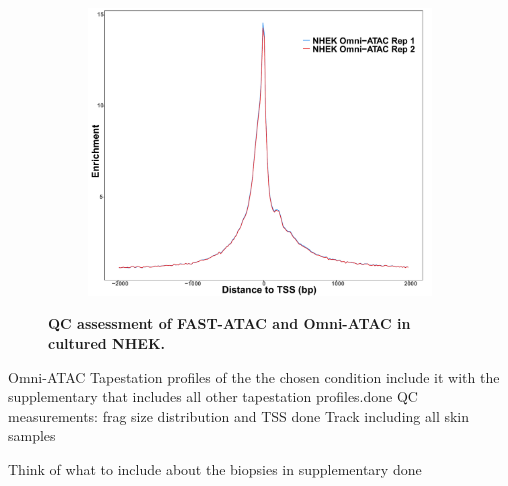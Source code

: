 \begin{figure}[htbp]
\begin{subfigure}{0.5\textwidth}
\centering
\includegraphics[width=\textwidth]{./Results1/pdfs/ATAC_skin_TSS_enrichment_NHEK_omni_ATAC}
\caption{\textbf{}} %
\end{subfigure}%
\caption[QC assessment of FAST-ATAC and Omni-ATAC in cultured NHEK]{\textbf{QC assessment of FAST-ATAC and Omni-ATAC in cultured NHEK.\\
}}
\label{fig:PS02_skin_ATAC_QC_assessment}
\end{figure} 






Omni-ATAC
Tapestation profiles of the the chosen condition include it with the supplementary that includes all other tapestation profiles.done
QC measurements: frag size distribution and TSS done
Track including all skin samples

Think of what to include about the biopsies in supplementary done



